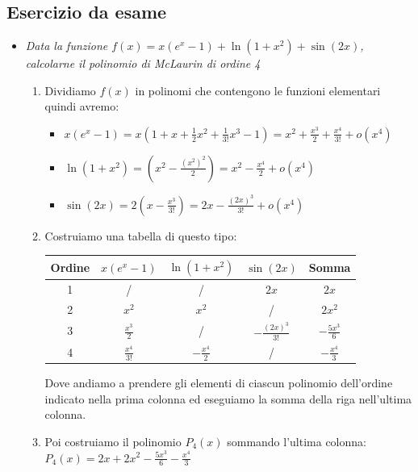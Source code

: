 \documentclass[10pt, a4paper]{article}
\begin{document}
        \subsection{Esercizio da esame}
        \begin{itemize}
            \item \textit{Data la funzione $f(x)=x(e^x-1)+\ln(1+x^2)+\sin(2x)$, calcolarne il polinomio di McLaurin di ordine 4} \begin{enumerate}
                \item Dividiamo $f(x)$ in polinomi che contengono le funzioni elementari quindi avremo: \begin{itemize}
                    \item $x(e^x-1)=x\left(1+x+\frac{1}{2}x^2+\frac{1}{3!}x^3-1\right)=x^2+\frac{x^3}{2}+\frac{x^4}{3!}+o\left(x^4\right)$
                    \item $\ln(1+x^2)=\left(x^2-\frac{(x^2)^2}{2}\right)=x^2-\frac{x^4}{2}+o\left(x^4\right)$
                    \item $\sin(2x)=2\left(x-\frac{x^3}{3!}\right)=2x-\frac{(2x)^3}{3!}+o\left(x^4\right)$
                \end{itemize}
                \item Costruiamo una tabella di questo tipo: 
                \begin{center}
                    \begin{tabular}{| c | c | c | c | c |}
                        \hline
                        \textbf{Ordine} & $x(e^x-1)$ & $\ln(1+x^2)$ & $\sin(2x)$ & \textbf{Somma}\\
                        \hline
                        1 & / & / & $2x$ & $2x$ \\
                        \hline
                        2 & $x^2$ & $x^2$ & / & $2x^2$\\
                        \hline
                        3 & $\frac{x^3}{2}$ & / & $-\frac{(2x)^3}{3!}$ & $-\frac{5x^3}{6}$\\
                        \hline
                        4 & $\frac{x^4}{3!}$ & $-\frac{x^4}{2}$ & / & $-\frac{x^4}{3}$\\
                        \hline
                    \end{tabular}
                \end{center}
                Dove andiamo a prendere gli elementi di ciascun polinomio dell'ordine indicato nella prima colonna ed eseguiamo la somma della riga nell'ultima colonna.
                \item Poi costruiamo il polinomio $P_4(x)$ sommando l'ultima colonna: $P_4(x)=2x+2x^2-\frac{5x^3}{6}-\frac{x^4}{3}$

\end{enumerate}
\end{itemize}
\end{document}
